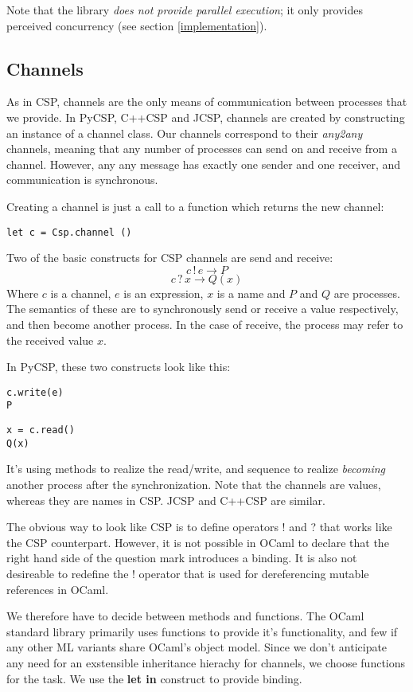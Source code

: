\documentclass[a4paper,12pt]{article}
\begin{document}
Note that the library \emph{does not provide parallel execution}; it only provides 
perceived concurrency (see section \ref{implementation}).

\subsection{Channels}

As in CSP, channels are the only means of communication between processes that we provide.
In PyCSP, C++CSP and JCSP, channels are created by constructing an instance of a channel
class. Our channels correspond to their \emph{any2any} channels, meaning that any number
of processes can send on and receive from a channel. However, any any message has exactly 
one sender and one receiver, and communication is synchronous.

Creating a channel is just a call to a function which returns the new channel:
\begin{verbatim}
let c = Csp.channel ()
\end{verbatim}

Two of the basic constructs for CSP channels are send and receive:
\[c\,!\,e \to P\]
\[c\,?\,x \to Q(x)\]
Where $c$ is a channel, $e$ is an expression, $x$ is a name and $P$ and $Q$ are processes. 
The semantics of these are to synchronously send or receive a value respectively, and
then become another process. In the case of receive, the process may refer to the
received value $x$.

In PyCSP, these two constructs look like this:
\begin{verbatim}
c.write(e)
P
\end{verbatim}
\begin{verbatim}
x = c.read()
Q(x)
\end{verbatim}
It's using methods to realize the read/write, and sequence to realize \emph{becoming}
another process after the synchronization. Note that the channels are values, whereas
they are names in CSP. JCSP and C++CSP are similar.

The obvious way to look like CSP is to define operators ! and ? that works like the
CSP counterpart. However, it is not possible in OCaml to declare that the right hand 
side of the question mark introduces a binding. It is also not desireable to redefine
the ! operator that is used for dereferencing mutable references in OCaml.

We therefore have to decide between methods and functions. The OCaml standard library
primarily uses functions to provide it's functionality, and few if any other ML 
variants share OCaml's object model. Since we don't anticipate any need for an
exstensible inheritance hierachy for channels, we choose functions for the task.
We use the \textbf{let in} construct to provide binding.
\end{document}

